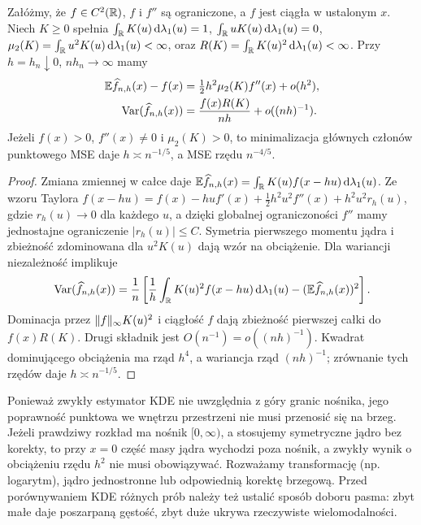 \begin{twierdzenie}
\label{thm:kde-bias-var}
Załóżmy, że $f\in C^2(\mathbb R)$, $f$ i $f''$ są ograniczone,
a $f$ jest ciągła w ustalonym $x$.
Niech $K\ge0$ spełnia
$\int_\mathbb R K(u)\,\mathrm d\lambda_1(u)=1$, $\int_\mathbb R uK(u)\,\mathrm d\lambda_1(u)=0$,
$\mu_2(K)=\int_\mathbb R u^2K(u)\,\mathrm d\lambda_1(u)<\infty$,
oraz $R(K)=\int_\mathbb R K(u)^2\,\mathrm d\lambda_1(u)<\infty$.
Przy $h=h_n\downarrow0$, $nh_n\to\infty$ mamy
\[
 \begin{aligned}
 \mathbb E\widehat f_{n,h}(x)-f(x)
   &=\tfrac12h^2\mu_2(K)f''(x)+o(h^2),\\
 \operatorname{Var}(\widehat f_{n,h}(x))
   &=\frac{f(x)R(K)}{nh}+o((nh)^{-1}).
 \end{aligned}
\]
Jeżeli $f(x)>0$, $f''(x)\ne0$ i $\mu_2(K)>0$,
to minimalizacja głównych członów punktowego MSE daje
$h\asymp n^{-1/5}$, a MSE rzędu $n^{-4/5}$.
\end{twierdzenie}
\begin{proof}
Zmiana zmiennej w całce daje
$\mathbb E\widehat f_{n,h}(x)=
\int_\mathbb R K(u)f(x-hu)\,\mathrm d\lambda_1(u)$.
Ze wzoru Taylora
$f(x-hu)=f(x)-hu f'(x)+
\tfrac12h^2u^2f''(x)+h^2u^2r_h(u)$,
gdzie $r_h(u)\to0$ dla każdego $u$, a dzięki
globalnej ograniczoności $f''$ mamy jednostajne
ograniczenie $|r_h(u)|\le C$.
Symetria pierwszego momentu jądra i zbieżność
zdominowana dla $u^2K(u)$ dają wzór na obciążenie.
Dla wariancji niezależność implikuje
\[
 \operatorname{Var}(\widehat f_{n,h}(x))=
 \frac1n\left[\frac1h
 \int_\mathbb R K(u)^2f(x-hu)\,\mathrm d\lambda_1(u)
 -(\mathbb E\widehat f_{n,h}(x))^2\right].
\]
Dominacja przez $\lVert f\rVert_\infty K(u)^2$ i ciągłość $f$
dają zbieżność pierwszej całki do $f(x)R(K)$.
Drugi składnik jest $O(n^{-1})=o((nh)^{-1})$.
Kwadrat dominującego obciążenia ma rząd $h^4$,
a wariancja rząd $(nh)^{-1}$; zrównanie tych rzędów
daje $h\asymp n^{-1/5}$.
\end{proof}

\begin{uwaga}
Ponieważ zwykły estymator KDE nie uwzględnia z góry granic
nośnika, jego poprawność punktowa we wnętrzu przestrzeni nie
musi przenosić się na brzeg.
Jeżeli prawdziwy rozkład ma nośnik $[0,\infty)$,
a stosujemy symetryczne jądro bez korekty, to
przy $x=0$ część masy jądra wychodzi poza nośnik,
a zwykły wynik o obciążeniu rzędu $h^2$ nie musi
obowiązywać. Rozważamy transformację (np. logarytm),
jądro jednostronne lub odpowiednią korektę brzegową.
Przed porównywaniem KDE różnych prób należy też
ustalić sposób doboru pasma: zbyt małe daje poszarpaną
gęstość, zbyt duże ukrywa rzeczywiste wielomodalności.
\end{uwaga}

